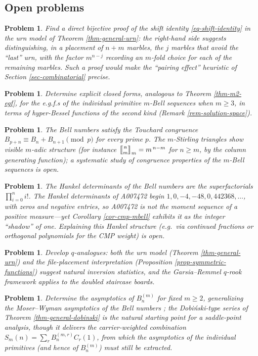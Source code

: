 \documentclass[a4paper]{amsart}
\numberwithin{equation}{section}
\newcommand{\mStirling}[0]{\genfrac{\llbracket}{\rrbracket}{0pt}{}}
\newtheorem{problem}[theorem]{Problem}
\begin{document}
\subsection{Open problems}
\begin{problem}
Find a direct bijective proof of the shift identity \eqref{eq-shift-identity} in the urn model of Theorem \ref{thm-general-urn}: the right-hand side suggests distinguishing, in a placement of $n+m$ marbles, the $j$ marbles that avoid the ``last'' urn, with the factor $m^{n-j}$ recording an $m$-fold choice for each of the remaining marbles. Such a proof would make the ``pairing effect'' heuristic of Section \ref{sec-combinatorial} precise.
\end{problem}
\begin{problem}
Determine explicit closed forms, analogous to Theorem \ref{thm-m2-egf}, for the e.g.f.s of the individual primitive $m$-Bell sequences when $m \geq 3$, in terms of hyper-Bessel functions of the second kind (Remark \ref{rem-solution-space}).
\end{problem}
\begin{problem}
The Bell numbers satisfy the Touchard congruence $B_{p+n} \equiv B_n + B_{n+1} \pmod p$ for every prime $p$. The $m$-Stirling triangles show visible $m$-adic structure (for instance $\mStirling{n}{m}_m = m^{\,n-m}$ for $n \geq m$, by the column generating function); a systematic study of congruence properties of the $m$-Bell sequences is open.
\end{problem}
\begin{problem}
The Hankel determinants of the Bell numbers are the superfactorials $\prod_{i=0}^{n} i!$. The Hankel determinants of A007472 begin $1, 0, -4, -48, 0, 442368, \ldots$, with zeros and negative entries, so A007472 is not the moment sequence of a positive measure---yet Corollary \ref{cor-cmp-mbell} exhibits it as the integer ``shadow'' of one. Explaining this Hankel structure (e.g.\ via continued fractions or orthogonal polynomials for the CMP weight) is open.
\end{problem}
\begin{problem}
Develop $q$-analogues: both the urn model (Theorem \ref{thm-general-urn}) and the file-placement interpretation (Proposition \ref{prop-symmetric-functions}) suggest natural inversion statistics, and the Garsia--Remmel $q$-rook framework \cite{garsiaRemmel1986} applies to the doubled staircase boards.
\end{problem}
\begin{problem}
Determine the asymptotics of $B^{(m)}_n$ for fixed $m \geq 2$, generalizing the Moser--Wyman asymptotics of the Bell numbers \cite{moserWyman1955}; the Dobi\'nski-type series of Theorem \ref{thm-general-dobinski} is the natural starting point for a saddle-point analysis, though it delivers the carrier-weighted combination $S_m(n) = \sum_r B^{(m,r)}_n C_r(1)$, from which the asymptotics of the individual primitives (and hence of $B^{(m)}_n$) must still be extracted.
\end{problem}
\end{document}
